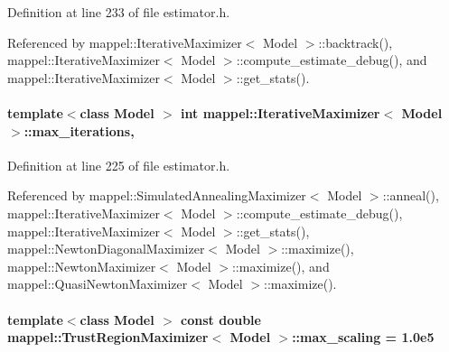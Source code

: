 Definition at line 233 of file estimator.\+h.



Referenced by mappel\+::\+Iterative\+Maximizer$<$ Model $>$\+::backtrack(), mappel\+::\+Iterative\+Maximizer$<$ Model $>$\+::compute\+\_\+estimate\+\_\+debug(), and mappel\+::\+Iterative\+Maximizer$<$ Model $>$\+::get\+\_\+stats().

\paragraph[{\texorpdfstring{max\+\_\+iterations}{max_iterations}}]{\setlength{\rightskip}{0pt plus 5cm}template$<$class Model $>$ int {\bf mappel\+::\+Iterative\+Maximizer}$<$ Model $>$\+::max\+\_\+iterations\hspace{0.3cm}{\ttfamily [protected]}, {\ttfamily [inherited]}}\hypertarget{classmappel_1_1IterativeMaximizer_ac888935f332b069836a559f44cd267c7}{}\label{classmappel_1_1IterativeMaximizer_ac888935f332b069836a559f44cd267c7}


Definition at line 225 of file estimator.\+h.



Referenced by mappel\+::\+Simulated\+Annealing\+Maximizer$<$ Model $>$\+::anneal(), mappel\+::\+Iterative\+Maximizer$<$ Model $>$\+::compute\+\_\+estimate\+\_\+debug(), mappel\+::\+Iterative\+Maximizer$<$ Model $>$\+::get\+\_\+stats(), mappel\+::\+Newton\+Diagonal\+Maximizer$<$ Model $>$\+::maximize(), mappel\+::\+Newton\+Maximizer$<$ Model $>$\+::maximize(), and mappel\+::\+Quasi\+Newton\+Maximizer$<$ Model $>$\+::maximize().

\paragraph[{\texorpdfstring{max\+\_\+scaling}{max_scaling}}]{\setlength{\rightskip}{0pt plus 5cm}template$<$class Model $>$ const double {\bf mappel\+::\+Trust\+Region\+Maximizer}$<$ Model $>$\+::max\+\_\+scaling = 1.\+0e5\hspace{0.3cm}{\ttfamily [static]}}\hypertarget{classmappel_1_1TrustRegionMaximizer_a37a277685002f747b8abef5ce374eb29}{}\label{classmappel_1_1TrustRegionMaximizer_a37a277685002f747b8abef5ce374eb29}


